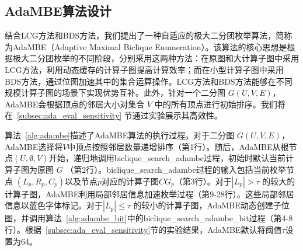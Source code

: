 \subsection{AdaMBE算法设计}
\label{subsec:ada_design_all}

结合LCG方法和BDS方法，我们提出了一种自适应的极大二分团枚举算法，简称为AdaMBE（Adaptive Maximal Biclique Enumeration）。该算法的核心思想是根据极大二分团枚举的不同阶段，分别采用这两种方法：在原图和大计算子图中采用LCG方法，利用动态缓存的计算子图提高计算效率；而在小型计算子图中采用BDS方法，通过位图加速其中的集合运算操作。LCG方法和BDS方法能够在不同规模计算子图的场景下实现优势互补。此外，针对一个二分图 $G(U,V,E)$，AdaMBE会根据顶点的邻居大小对集合 $V$ 中的所有顶点进行初始排序。我们将在~\ref{subsec:ada_eval_sensitivity} 节通过实验展示其高效性。




算法~\ref{alg:adambe}描述了AdaMBE算法的执行过程。对于二分图 $G(U,V,E)$，AdaMBE选择将$V$中顶点按照邻居数量递增排序（第1行）。随后，AdaMBE从根节点$(U,\emptyset,V)$开始，递归地调用\textsf{biclique\_search\_adambe}过程，初始时默认当前计算子图为原图 $G$ （第2行）。\textsf{biclique\_search\_adambe}过程的输入包括当前枚举节点 $(L_p, R_p, C_p)$以及节点$p$对应的计算子图$CG_p$（第3行）。对于$|L_p| > \tau$ 的较大的计算子图，AdaMBE利用局部邻居信息加速枚举过程（第9-28行）。这些局部邻居信息以蓝色字体标记。对于$|L_p| \le \tau$ 的较小的计算子图，AdaMBE动态创建子位图，并调用算法~\ref{alg:adambe_bit}中的\textsf{biclique\_search\_adambe\_bit}过程（第4-8行）。根据~\ref{subsec:ada_eval_sensitivity}节的实验结果，AdaMBE默认将阈值$\tau$设置为64。






